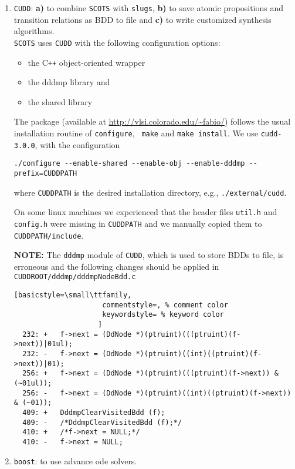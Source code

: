 \documentclass[a4paper]{amsart}
\newcommand\Cpp{C\texttt{++} }
\begin{document}
\begin{enumerate}
  \item
  \label{i:cudd}
  {\tt CUDD}: {\bf  a)} to combine {\tt SCOTS} with {\tt slugs}, {\bf b)} to save atomic propositions
  and transition relations as BDD to file and {\bf c)} to write customized
  synthesis algorithms.\\
  {\tt SCOTS} uses {\tt CUDD} with the following configuration options:
     \begin{itemize}
      \item the \Cpp{} object-oriented wrapper
      \item the dddmp library and
      \item the shared library 
    \end{itemize}
   The package (available at \url{http://vlsi.colorado.edu/~fabio/})
 follows the usual installation routine of {\tt \small configure}, {\tt
   \small make} and
   {\tt \small make install}. We use {\tt \small cudd-3.0.0}, with the
   configuration
  \begin{lstlisting}[basicstyle=\small\ttfamily,frame=none]
  ./configure --enable-shared --enable-obj --enable-dddmp --prefix=CUDDPATH
  \end{lstlisting}
  where {\tt CUDDPATH} is the desired installation directory, e.g., {\tt ./external/cudd}.

  On some linux machines we experienced that the header files {\tt \small util.h} and
  {\tt \small config.h} were missing in {\tt \small CUDDPATH} and we manually
  copied them to {\tt \small CUDDPATH/include}.

  {\bf NOTE:} The {\tt dddmp} module of {\tt CUDD}, which is used to store BDDs
  to file, is erroneous and the following changes should be applied in {\tt CUDDROOT/dddmp/dddmpNodeBdd.c} 
  \begin{lstlisting}[basicstyle=\small\ttfamily,
                     commentstyle=, % comment color
                     keywordstyle= % keyword color
                    ]
  232: +   f->next = (DdNode *)(ptruint)(((ptruint)(f->next))|01ul);
  232: -   f->next = (DdNode *)(ptruint)((int)((ptruint)(f->next))|01);
  256: +   f->next = (DdNode *)(ptruint)(((ptruint)(f->next)) & (~01ul));
  256: -   f->next = (DdNode *)(ptruint)((int)((ptruint)(f->next)) & (~01));
  409: +   DddmpClearVisitedBdd (f);
  409: -   /*DddmpClearVisitedBdd (f);*/   
  410: +   /*f->next = NULL;*/
  410: -   f->next = NULL;
  \end{lstlisting}


  \item {\tt boost}: to use advance ode solvers. 


\end{enumerate}
\end{document}
